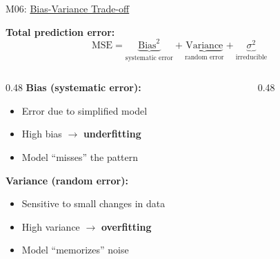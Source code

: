\documentclass[aspectratio=169, 10pt]{beamer}
\begin{document}
\begin{frame}{M06: \href{https://en.wikipedia.org/wiki/Bias\%E2\%80\%93variance_tradeoff}{Bias-Variance Trade-off}}

    \textbf{Total prediction error:}
    \[ \text{MSE} = \underbrace{\text{Bias}^2}_{\text{systematic error}} + \underbrace{\text{Variance}}_{\text{random error}} + \underbrace{\sigma^2}_{\text{irreducible}} \]

    \vspace{1mm}
    \begin{columns}
        \begin{column}{0.48\textwidth}
            \textbf{Bias (systematic error):}
            \begin{itemize}
                \item Error due to simplified model
                \item High bias $\rightarrow$ \textbf{underfitting}
                \item Model ``misses'' the pattern
            \end{itemize}

            \vspace{2mm}
            \textbf{Variance (random error):}
            \begin{itemize}
                \item Sensitive to small changes in data
                \item High variance $\rightarrow$ \textbf{overfitting}
                \item Model ``memorizes'' noise
            \end{itemize}
        \end{column}

        \begin{column}{0.48\textwidth}
            \begin{center}
\end{center}
\end{column}
\end{columns}
\end{frame}
\end{document}
